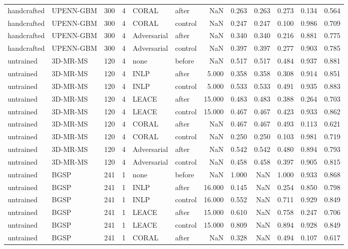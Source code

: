 \begin{tabular}{llrrllrrrrrr}
handcrafted & UPENN-GBM & 300 & 4 & CORAL & after & NaN & 0.263 & 0.263 & 0.273 & 0.134 & 0.564 \\
handcrafted & UPENN-GBM & 300 & 4 & CORAL & control & NaN & 0.247 & 0.247 & 0.100 & 0.986 & 0.709 \\
handcrafted & UPENN-GBM & 300 & 4 & Adversarial & after & NaN & 0.340 & 0.340 & 0.216 & 0.881 & 0.775 \\
handcrafted & UPENN-GBM & 300 & 4 & Adversarial & control & NaN & 0.397 & 0.397 & 0.277 & 0.903 & 0.785 \\
untrained & 3D-MR-MS & 120 & 4 & none & before & NaN & 0.517 & 0.517 & 0.484 & 0.937 & 0.881 \\
untrained & 3D-MR-MS & 120 & 4 & INLP & after & 5.000 & 0.358 & 0.358 & 0.308 & 0.914 & 0.851 \\
untrained & 3D-MR-MS & 120 & 4 & INLP & control & 5.000 & 0.533 & 0.533 & 0.491 & 0.935 & 0.883 \\
untrained & 3D-MR-MS & 120 & 4 & LEACE & after & 15.000 & 0.483 & 0.483 & 0.388 & 0.264 & 0.703 \\
untrained & 3D-MR-MS & 120 & 4 & LEACE & control & 15.000 & 0.467 & 0.467 & 0.423 & 0.933 & 0.862 \\
untrained & 3D-MR-MS & 120 & 4 & CORAL & after & NaN & 0.467 & 0.467 & 0.493 & 0.113 & 0.621 \\
untrained & 3D-MR-MS & 120 & 4 & CORAL & control & NaN & 0.250 & 0.250 & 0.103 & 0.981 & 0.719 \\
untrained & 3D-MR-MS & 120 & 4 & Adversarial & after & NaN & 0.542 & 0.542 & 0.480 & 0.894 & 0.793 \\
untrained & 3D-MR-MS & 120 & 4 & Adversarial & control & NaN & 0.458 & 0.458 & 0.397 & 0.905 & 0.815 \\
untrained & BGSP & 241 & 1 & none & before & NaN & 1.000 & NaN & 1.000 & 0.933 & 0.868 \\
untrained & BGSP & 241 & 1 & INLP & after & 16.000 & 0.145 & NaN & 0.254 & 0.850 & 0.798 \\
untrained & BGSP & 241 & 1 & INLP & control & 16.000 & 0.552 & NaN & 0.711 & 0.929 & 0.849 \\
untrained & BGSP & 241 & 1 & LEACE & after & 15.000 & 0.610 & NaN & 0.758 & 0.247 & 0.706 \\
untrained & BGSP & 241 & 1 & LEACE & control & 15.000 & 0.809 & NaN & 0.894 & 0.928 & 0.849 \\
untrained & BGSP & 241 & 1 & CORAL & after & NaN & 0.328 & NaN & 0.494 & 0.107 & 0.617 \\

\end{tabular}
